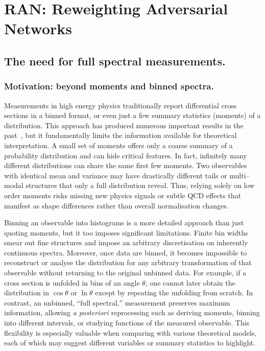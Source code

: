 \chapter{RAN: Reweighting Adversarial Networks}
\label{chap:ran}
\section{The need for full spectral measurements.}
    \label{sec:need-for-density-unfolding}
    \subsection{Motivation: beyond moments and binned spectra.}
    Measurements in high energy physics traditionally report differential cross sections in a binned format, or even just a few summary statistics (moments) of a distribution. 
    This approach has produced numerous important results in the past~\cite{GomezAmbrosio:2022mpm, Benato:2025rgo, ATLAS:2017dhr, alhroobSingleTopQuark,cowan_statistical_1998}, but it fundamentally limits the information available for theoretical interpretation.
    A small set of moments offers only a coarse summary of a probability distribution and can hide critical features.
    In fact, infinitely many different distributions can share the same first few moments.
    Two observables with identical mean and variance may have drastically different tails or multi--modal structures that only a full distribution reveal.
    Thus, relying solely on low order moments risks missing new physics signals or subtle QCD effects that manifest as shape differences rather than overall normalisation changes.

    Binning an observable into histograms is a more detailed approach than just quoting moments, but it too imposes significant limitations.
    Finite bin widths smear out fine structures and impose an arbitrary discretisation on inherently continuous spectra.
    Moreover, once data are binned, it becomes impossible to reconstruct or analyse the distribution for any arbitrary transformation of that observable without returning to the original unbinned data.
    For example, if a cross section is unfolded in bins of an angle $\theta$, one cannot later obtain the distribution in $\cos\theta$ or $\ln\theta$ except by repeating the unfolding from scratch.
    In contrast, an unbinned, ``full spectral,'' measurement preserves maximum information, allowing \textit{a posteriori} reprocessing such as deriving moments, binning into different intervals, or studying functions of the measured observable.
    This flexibility is especially valuable when comparing with various theoretical models, each of which may suggest different variables or summary statistics to highlight.

